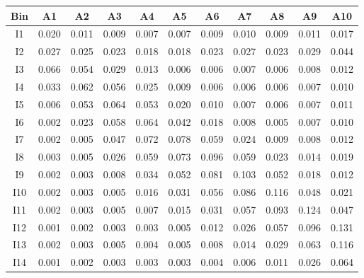 \begin{tabular}{c@{~~~}c@{~~}c@{~~}c@{~~}c@{~~}c@{~~}c@{~~}c@{~~}c@{~~}c@{~~}c}
\hline
 \hline
Bin	& A1 & A2 & A3 & A4 & A5 & A6 & A7 & A8 & A9 & A10 \\
\hline
I1	&  0.020 &  0.011 &  0.009 &  0.007 &  0.007 &  0.009 &  0.010 &  0.009 &  0.011 &  0.017 \\
I2	&  0.027 &  0.025 &  0.023 &  0.018 &  0.018 &  0.023 &  0.027 &  0.023 &  0.029 &  0.044 \\
I3	&  0.066 &  0.054 &  0.029 &  0.013 &  0.006 &  0.006 &  0.007 &  0.006 &  0.008 &  0.012 \\
I4	&  0.033 &  0.062 &  0.056 &  0.025 &  0.009 &  0.006 &  0.006 &  0.006 &  0.007 &  0.010 \\
I5	&  0.006 &  0.053 &  0.064 &  0.053 &  0.020 &  0.010 &  0.007 &  0.006 &  0.007 &  0.011 \\
I6	&  0.002 &  0.023 &  0.058 &  0.064 &  0.042 &  0.018 &  0.008 &  0.005 &  0.007 &  0.010 \\
I7	&  0.002 &  0.005 &  0.047 &  0.072 &  0.078 &  0.059 &  0.024 &  0.009 &  0.008 &  0.012 \\
I8	&  0.003 &  0.005 &  0.026 &  0.059 &  0.073 &  0.096 &  0.059 &  0.023 &  0.014 &  0.019 \\
I9	&  0.002 &  0.003 &  0.008 &  0.034 &  0.052 &  0.081 &  0.103 &  0.052 &  0.018 &  0.012 \\
I10	&  0.002 &  0.003 &  0.005 &  0.016 &  0.031 &  0.056 &  0.086 &  0.116 &  0.048 &  0.021 \\
I11	&  0.002 &  0.003 &  0.005 &  0.007 &  0.015 &  0.031 &  0.057 &  0.093 &  0.124 &  0.047 \\
I12	&  0.001 &  0.002 &  0.003 &  0.003 &  0.005 &  0.012 &  0.026 &  0.057 &  0.096 &  0.131 \\
I13	&  0.002 &  0.003 &  0.005 &  0.004 &  0.005 &  0.008 &  0.014 &  0.029 &  0.063 &  0.116 \\
I14	&  0.001 &  0.002 &  0.003 &  0.003 &  0.003 &  0.004 &  0.006 &  0.011 &  0.026 &  0.064 \\
\hline
 \hline
\end{tabular}

